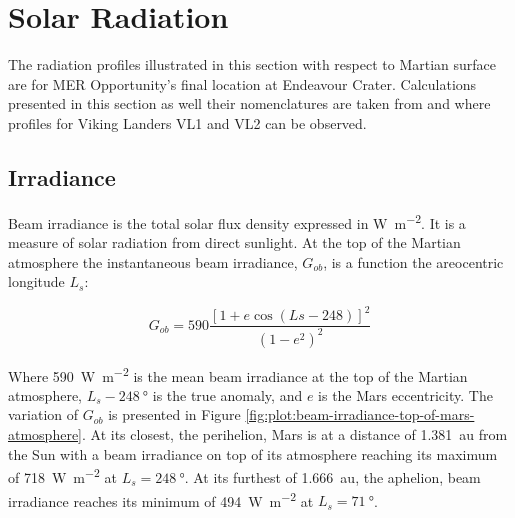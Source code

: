 \section{Solar Radiation}
\label{sec:MartianEnvironment:SolarRadiation}


The radiation profiles illustrated in this section with respect to Martian surface are for MER Opportunity's final location at Endeavour Crater. Calculations presented in this section as well their nomenclatures are taken from  and  where profiles for Viking Landers VL1 and VL2 can be observed.

\subsection{Irradiance}
\label{sec:MartianEnvironment:SolarRadiation:Irradiance}

Beam irradiance is the total solar flux density expressed in \si{\watt\per\meter\squared}. It is a measure of solar radiation from direct sunlight. At the top of the Martian atmosphere the instantaneous beam irradiance, $G_{ob}$, is a function the areocentric longitude $L_{s}$:

\begin{equation}
  \label{eq:G_ob}
  G_{ob} = 590 \frac{[1 + e \cos{(Ls - 248)}]^2}{(1-e^2)^2}
\end{equation}

Where \SI{590}{\watt\per\meter\squared} is the mean beam irradiance at the top of the Martian atmosphere, $L_{s} - \SI{248}{\degree}$ is the true anomaly, and $e$ is the Mars eccentricity. The variation of $G_{ob}$ is presented in Figure \ref{fig:plot:beam-irradiance-top-of-mars-atmosphere}. At its closest, the perihelion, Mars is at a distance of \SI{1.381}{\astronomicalunit} from the Sun with a beam irradiance on top of its atmosphere reaching its maximum of \SI{718}{\watt\per\meter\squared} at $L_{s} = \SI{248}{\degree}$. At its furthest of \SI{1.666}{\astronomicalunit}, the aphelion, beam irradiance reaches its minimum of \SI{494}{\watt\per\meter\squared} at $L_{s} = \SI{71}{\degree}$.

